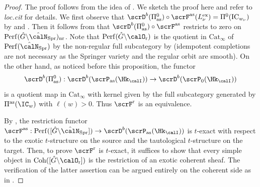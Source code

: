 \documentclass[10pt, reqno]{amsart}
\theoremstyle{plain}
\theoremstyle{definition}
\numberwithin{equation}{section}
\begin{document}
\begin{proof}
	The proof follows from the idea of \cite[Proposition 7.2.6]{AR}. We sketch the proof here and refer to \textit{loc.cit} for details.
	We first observe that $\scrD^b(\Pi^0_\mathrm{as})\circ \scrF^\mathrm{as}(L_\nu^\mathrm{ex})=\Pi^0(\mathrm{IC}_{w_{\nu}})$ by  and . Then it follows from  that
	$\scrD^b(\Pi^0_\mathrm{as})\circ \scrF^\mathrm{as}$ restricts to zero on $\mathrm{Perf}(\hat{G}\backslash \hat{\calN}_\mathrm{Spr})_{\mathrm{nr}}$. Note that $\mathrm{Perf}(\hat{G}\backslash \calO_{\mathrm{r}})$ is the quotient in $\mathrm{Cat}_\infty$ of $\mathrm{Perf}(\hat{\calN}_{\mathrm{Spr}})$ by the non-regular full subcategory by  (idempotent completions are not necessary as the Springer variety and the regular orbit are smooth). On the other hand, as noticed before this proposition, the functor
	\begin{equation}
		\scrD^b(\Pi^0_\mathrm{as}):\scrD^b(\scrP_{\mathrm{as}}(\Hk_\calI))\rightarrow \scrD^b(\scrP_0(\Hk_{\calI}))
	\end{equation}			
	is a quotient map in $\mathrm{Cat}_\infty$ with kernel given by the full subcategory generated by $\Pi^{\mathrm{as}}(\IC_w)$ with $\ell(w)>0$. Thus $\scrF^\mathrm{r}$ is an equivalence. 
	
	By , the restriction functor $\scrF^\mathrm{as}: \mathrm{Perf}([\hat{G}\backslash\hat{\calN}_{\mathrm{Spr}}])\rightarrow \scrD^b(\scrP_\mathrm{as}(\Hk_{\calI}))$ is $t$-exact with respect to the exotic $t$-structure on the source and the tautological
	$t$-structure on the target. Then, to prove $\scrF^\mathrm{r}$ is $t$-exact, it suffices to show that every simple object in $\mathrm{Coh}([\hat{G}\backslash \calO_\mathrm{r}])$ is the restriction of an exotic coherent sheaf. The verification of the latter assertion can be argued entirely on the coherent side as in \cite[Proposition 7.2.6]{AR}.
\end{proof}
\end{document}
